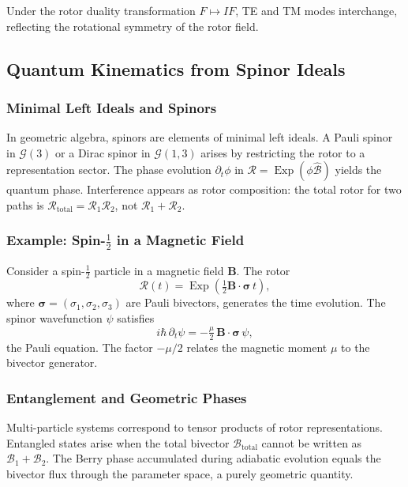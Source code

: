 \documentclass[11pt,a4paper]{article}
\newcommand{\Exp}{\operatorname{Exp}}
\newcommand{\Rotor}{\mathcal{R}}
\newcommand{\Biv}{\mathcal{B}}
\theoremstyle{definition}
\theoremstyle{plain}
\theoremstyle{remark}
\begin{document}
Under the rotor duality transformation $F \mapsto IF$, TE and TM modes interchange, reflecting the rotational symmetry of the rotor field.

\subsection{Quantum Kinematics from Spinor Ideals}

\subsubsection{Minimal Left Ideals and Spinors}

In geometric algebra, spinors are elements of minimal left ideals. A Pauli spinor in $\mathcal{G}(3)$ or a Dirac spinor in $\mathcal{G}(1,3)$ arises by restricting the rotor to a representation sector. The phase evolution $\partial_t \phi$ in $\Rotor = \Exp(\phi\hat{\Biv})$ yields the quantum phase. Interference appears as rotor composition: the total rotor for two paths is $\Rotor_{\text{total}} = \Rotor_1 \Rotor_2$, not $\Rotor_1 + \Rotor_2$.

\subsubsection{Example: Spin-$\tfrac{1}{2}$ in a Magnetic Field}

Consider a spin-$\tfrac{1}{2}$ particle in a magnetic field $\mathbf{B}$. The rotor
\begin{equation}
\Rotor(t) = \Exp\!\left(\tfrac{1}{2}\mathbf{B}\cdot\bm{\sigma}\, t\right),
\end{equation}
where $\bm{\sigma} = (\sigma_1, \sigma_2, \sigma_3)$ are Pauli bivectors, generates the time evolution. The spinor wavefunction $\psi$ satisfies
\begin{equation}
i\hbar\, \partial_t \psi = -\tfrac{\mu}{2}\, \mathbf{B}\cdot\bm{\sigma}\, \psi,
\end{equation}
the Pauli equation. The factor $-\mu/2$ relates the magnetic moment $\mu$ to the bivector generator.

\subsubsection{Entanglement and Geometric Phases}

Multi-particle systems correspond to tensor products of rotor representations. Entangled states arise when the total bivector $\Biv_{\text{total}}$ cannot be written as $\Biv_1 + \Biv_2$. The Berry phase accumulated during adiabatic evolution equals the bivector flux through the parameter space, a purely geometric quantity.
\end{document}
